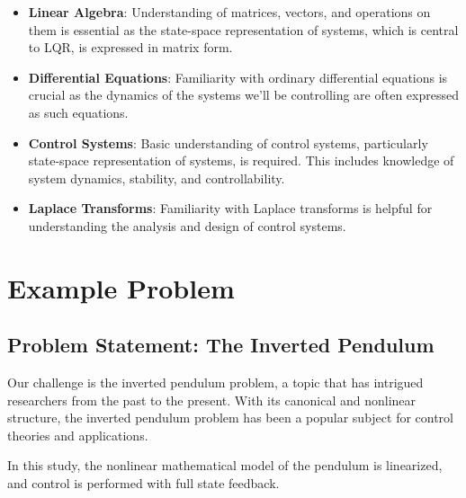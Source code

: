 \documentclass[11pt,twocolumn,twoside,lineno]{pnas-new}
\begin{document}
\begin{itemize}
       \item \textbf{Linear Algebra}: Understanding of matrices, vectors, and operations on them is essential as the state-space representation of systems, which is central to LQR, is expressed in matrix form.
       \item \textbf{Differential Equations}: Familiarity with ordinary differential equations is crucial as the dynamics of the systems we'll be controlling are often expressed as such equations.
       \item \textbf{Control Systems}: Basic understanding of control systems, particularly state-space representation of systems, is required. This includes knowledge of system dynamics, stability, and controllability.
       \item \textbf{Laplace Transforms}: Familiarity with Laplace transforms is helpful for understanding the analysis and design of control systems.
\end{itemize}

\section{Example Problem}
\subsection{Problem Statement: The Inverted Pendulum}
Our challenge is the inverted pendulum problem, a topic that has intrigued researchers from the past to the present. With its canonical and nonlinear structure, the inverted pendulum problem has been a popular subject for control theories and applications.

In this study, the nonlinear mathematical model of the pendulum is linearized, and control is performed with full state feedback. 
\end{document}
